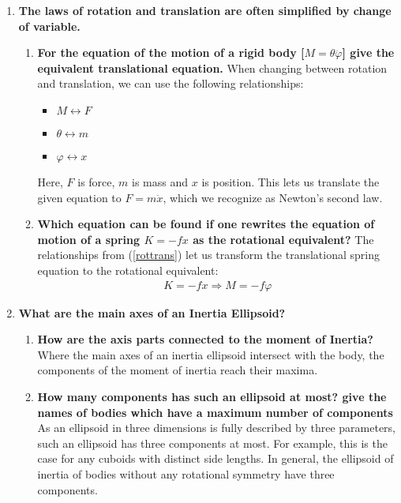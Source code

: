 \begin{enumerate}
\begin{enumerate}
	\end{enumerate}
	\item
	\textbf{The laws of rotation and translation are often simplified by change of variable.}
	\begin{enumerate}
		\item 
		\textbf{For the equation of the motion of a rigid body [$M = \theta \ddot{\varphi}$] give the equivalent translational equation.}
		When changing between rotation and translation, we can use the following relationships:
		\begin{itemize}
			\label{rottrans}
			\item $M \leftrightarrow F$
			\item $\theta \leftrightarrow m$
			\item $\varphi \leftrightarrow x$
		\end{itemize}
		Here, $F$ is force, $m$ is mass and $x$ is position.
		This lets us translate the given equation to $F = m \ddot{x}$, which we recognize as Newton's second law.
		\item
		\textbf{Which equation can be found if one rewrites the equation of motion of a spring $K = -fx$ as the rotational equivalent?}
		The relationships from (\ref{rottrans}) let us transform the translational spring equation to the rotational equivalent:
		\begin{align*}
			K = -fx \Longrightarrow M = -f \varphi
		\end{align*}
		
	\end{enumerate}
	\item
	\textbf{What are the main axes of an Inertia Ellipsoid?}

	\begin{enumerate}
		\item 
		\textbf{How are the axis parts connected to the moment of Inertia?}
		Where the main axes of an inertia ellipsoid intersect with the body, the components of the moment of inertia reach their maxima.
		
		
		\item
		\textbf{How many components has such an ellipsoid at most? give the names of bodies which have a maximum number of components}
		As an ellipsoid in three dimensions is fully described by three parameters, such an ellipsoid has three components at most.
		For example, this is the case for any cuboids with distinct side lengths.
		In general, the ellipsoid of inertia of bodies without any rotational symmetry have three components.
		

\end{enumerate}
\end{enumerate}

